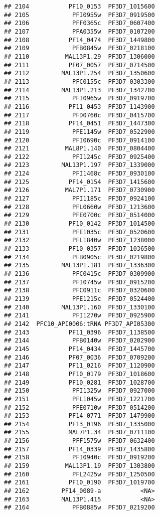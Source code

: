 \documentclass[12pt, a4paper]{article}\usepackage[]{graphicx}\usepackage[]{color}
\makeatletter
\newenvironment{kframe}{%
 \def\at@end@of@kframe{}%
 \ifinner\ifhmode%
  \def\at@end@of@kframe{\end{minipage}}%
  \begin{minipage}{\columnwidth}%
 \fi\fi%
 \def\FrameCommand##1{\hskip\@totalleftmargin \hskip-\fboxsep
 \colorbox{shadecolor}{##1}\hskip-\fboxsep
     \hskip-\linewidth \hskip-\@totalleftmargin \hskip\columnwidth}%
 \MakeFramed {\advance\hsize-\width
   \@totalleftmargin\z@ \linewidth\hsize
   \@setminipage}}%
 {\par\unskip\endMakeFramed%
 \at@end@of@kframe}
\newenvironment{knitrout}{}{} %
\makeatother
\begin{document}
\begin{knitrout}
\begin{kframe}
\begin{verbatim}
## 2104           PF10_0153  PF3D7_1015600
## 2105            PFI0955w  PF3D7_0919500
## 2106            PFF0365c  PF3D7_0607400
## 2107            PFA0355w  PF3D7_0107200
## 2108           PF14_0474  PF3D7_1449800
## 2109            PFB0845w  PF3D7_0218100
## 2110          MAL13P1.29  PF3D7_1306000
## 2111           PF07_0057  PF3D7_0714500
## 2112         MAL13P1.254  PF3D7_1350600
## 2113            PFC0155c  PF3D7_0303300
## 2114         MAL13P1.213  PF3D7_1342700
## 2115            PFI0965w  PF3D7_0919700
## 2116           PF11_0453  PF3D7_1143900
## 2117            PFD0760c  PF3D7_0415700
## 2118           PF14_0451  PF3D7_1447300
## 2119            PFE1145w  PF3D7_0522900
## 2120            PFI0690c  PF3D7_0914100
## 2121          MAL8P1.140  PF3D7_0804400
## 2122            PFI1245c  PF3D7_0925400
## 2123         MAL13P1.197  PF3D7_1339000
## 2124            PFI1468c  PF3D7_0930100
## 2125           PF14_0154  PF3D7_1415600
## 2126          MAL7P1.171  PF3D7_0730900
## 2127            PFI1185c  PF3D7_0924100
## 2128            PFL0660w  PF3D7_1213600
## 2129            PFE0700c  PF3D7_0514000
## 2130           PF10_0142  PF3D7_1014500
## 2131            PFE1035c  PF3D7_0520600
## 2132            PFL1840w  PF3D7_1238000
## 2133           PF10_0357  PF3D7_1036500
## 2134            PFB0905c  PF3D7_0219800
## 2135         MAL13P1.181  PF3D7_1336300
## 2136            PFC0415c  PF3D7_0309900
## 2137            PFI0745w  PF3D7_0915200
## 2138            PFC0911c  PF3D7_0320600
## 2139            PFE1215c  PF3D7_0524400
## 2140         MAL13P1.160  PF3D7_1330100
## 2141            PFI1270w  PF3D7_0925900
## 2142  PFC10_API0006:tRNA PF3D7_API05300
## 2143           PF11_0396  PF3D7_1138500
## 2144            PFB0140w  PF3D7_0202900
## 2145           PF14_0434  PF3D7_1445700
## 2146           PF07_0036  PF3D7_0709200
## 2147           PF11_0216  PF3D7_1120900
## 2148           PF10_0179  PF3D7_1018600
## 2149           PF10_0281  PF3D7_1028700
## 2150            PFI1325w  PF3D7_0927000
## 2151            PFL1045w  PF3D7_1221700
## 2152            PFE0710w  PF3D7_0514200
## 2153           PF14_0771  PF3D7_1479900
## 2154           PF13_0196  PF3D7_1335000
## 2155           MAL7P1.34  PF3D7_0711100
## 2156            PFF1575w  PF3D7_0632400
## 2157           PF14_0339  PF3D7_1435800
## 2158            PFI0940c  PF3D7_0919200
## 2159          MAL13P1.19  PF3D7_1303800
## 2160            PFL2425w  PF3D7_1250500
## 2161           PF10_0190  PF3D7_1019700
## 2162         PF14_0089-a           <NA>
## 2163         MAL13P1.415           <NA>
## 2164            PFB0885w  PF3D7_0219200

\end{verbatim}
\end{kframe}
\end{knitrout}
\end{document}
